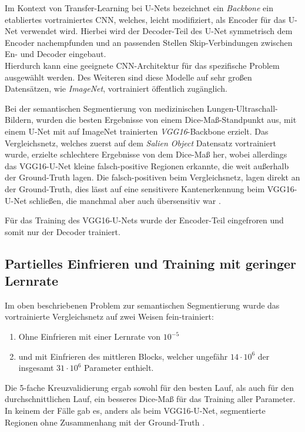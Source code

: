 Im Kontext von Transfer-Learning bei U-Nets bezeichnet ein \textit{Backbone} ein etabliertes vortrainiertes \ac{CNN}, 
welches, leicht modifiziert, als Encoder für das U-Net verwendet wird. Hierbei wird der Decoder-Teil des U-Net 
symmetrisch dem Encoder nachempfunden und an passenden Stellen Skip-Verbindungen zwischen En- und Decoder eingebaut. \\
Hierdurch kann eine geeignete \ac{CNN}-Architektur für das spezifische Problem ausgewählt werden. Des Weiteren sind diese 
Modelle auf sehr großen Datensätzen, wie \textit{ImageNet}, vortrainiert öffentlich zugänglich. 

Bei der semantischen Segmentierung von medizinischen Lungen-Ultraschall-Bildern, wurden die besten Ergebnisse von einem Dice-Maß-Standpunkt aus, 
mit einem U-Net mit auf ImageNet trainierten \textit{VGG16}-Backbone erzielt. Das Vergleichsnetz, welches zuerst auf dem \textit{Salien Object}
Datensatz vortrainiert wurde, erzielte schlechtere Ergebnisse von dem Dice-Maß her, wobei allerdings das VGG16-U-Net kleine falsch-positive 
Regionen erkannte, die weit außerhalb der Ground-Truth lagen. Die falsch-positiven beim Vergleichsnetz, lagen direkt an der Ground-Truth, 
dies lässt auf eine sensitivere Kantenerkennung beim VGG16-U-Net schließen, die manchmal aber auch übersensitiv war \cite{Cheng.05.10.2021}. 

Für das Training des VGG16-U-Nets wurde der Encoder-Teil eingefroren und somit nur der Decoder trainiert. 

\subsection{Partielles Einfrieren und Training mit geringer Lernrate}

Im oben beschriebenen Problem zur semantischen Segmentierung wurde das vortrainierte Vergleichsnetz auf zwei Weisen fein-trainiert:
\begin{enumerate}
	\item Ohne Einfrieren mit einer Lernrate von $10^{-5}$
	\item und mit Einfrieren des mittleren Blocks, welcher ungefähr $14\cdot 10^6$ der insgesamt $31 \cdot 10^6$ Parameter enthielt. 
\end{enumerate}
Die 5-fache Kreuzvalidierung ergab sowohl für den besten Lauf, als auch für den durchschnittlichen Lauf, ein besseres Dice-Maß 
für das Training aller Parameter. In keinem der Fälle gab es, anders als beim VGG16-U-Net, segmentierte Regionen ohne Zusammenhang mit der Ground-Truth \cite{Cheng.05.10.2021}. 

